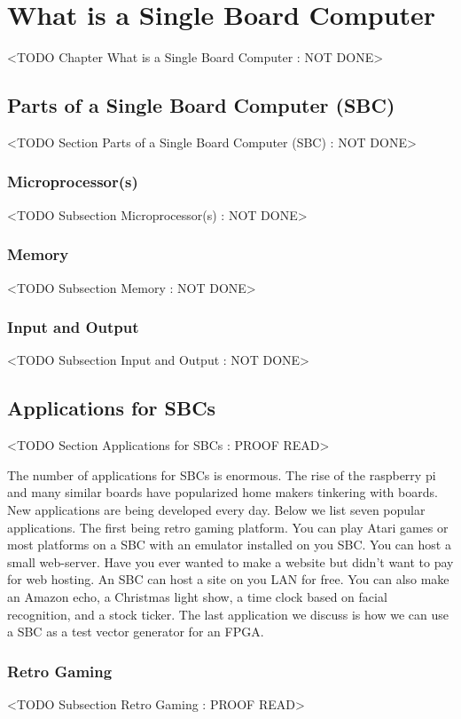 \chapter{What is a Single Board Computer}
	<TODO Chapter What is a Single Board Computer : NOT DONE>

\section{Parts of a Single Board Computer (SBC)}
	<TODO Section Parts of a Single Board Computer (SBC) : NOT DONE>

\subsection{Microprocessor(s)}
	<TODO Subsection Microprocessor(s) : NOT DONE>

\subsection{Memory}
	<TODO Subsection Memory : NOT DONE>

\subsection{Input and Output}
	<TODO Subsection Input and Output : NOT DONE>

\section{Applications for SBCs}
	<TODO Section Applications for SBCs : PROOF READ>
	
The number of applications for \ac{SBC}s is enormous. The rise of the raspberry pi and many similar boards have popularized home makers tinkering with boards. New applications are being developed every day.  Below we list seven popular applications. The first being retro gaming platform. You can play Atari games or most platforms on a \ac{SBC} with an emulator installed on you \ac{SBC}. You can host a small web-server. Have you ever wanted to make a website but didn't want to pay for web hosting. An \ac{SBC} can host a site on you \ac{LAN} for free. You can also make an Amazon echo, a Christmas light show, a time clock based on facial recognition, and a stock ticker. The last application we discuss is how we can use a \ac{SBC} as a test vector generator for an \ac{FPGA}. 

\subsection{Retro Gaming}
	<TODO Subsection Retro Gaming : PROOF READ>
	
